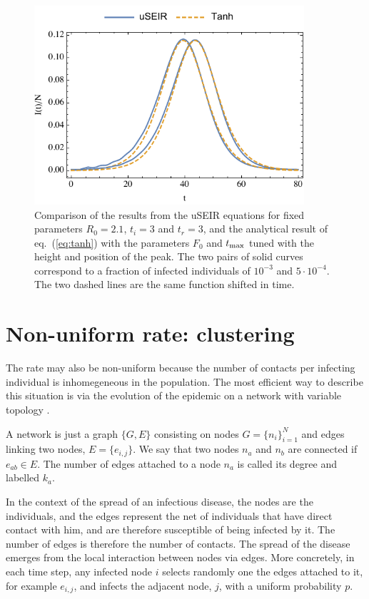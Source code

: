 \documentclass[a4paper,oneside,11pt]{article}
\begin{document}
\begin{figure}[h!]
  \centering
  \includegraphics[width=10cm]{logistica.pdf}
  \caption{Comparison of the results from the uSEIR equations for fixed parameters $R_0=2.1$, $t_i=3$ and $t_r=3$, and the analytical result of  eq.~(\ref{eq:tanh}) with the parameters $F_0$ and $t_{\rm max}$ tuned with the height and position of the peak. The two pairs of solid curves correspond to a fraction of infected individuals of $10^{-3}$ and $5\cdot 10^{-4}$. The two dashed lines are the same function shifted in time.}
  \label{fig:dispersion}
   \end{figure}

   \section{Non-uniform rate: clustering  }
\label{sec:r}

The rate may also be non-uniform because the number of contacts per infecting individual is inhomegeneous in the population. The most efficient way to describe this situation is via the evolution of the epidemic on a network with variable topology \cite{}.

A network is just a graph \(\{G,E\}\)
consisting on
nodes \(G=\{n_i\}_{i=1}^N\) and edges linking two nodes, \(E=\{e_{i,j}\}\). We say that
two nodes \(n_a\) and \(n_b\) are connected if \(e_{ab}\in E\). The number
of edges attached to a node \(n_a\) is called its degree and labelled
\(k_a\).

In the context of the spread of an infectious disease, the nodes are
the individuals, and the edges represent the net of individuals
that have direct contact with him, and are therefore susceptible of being infected by it. The number of edges is therefore the number of contacts. The spread of the disease emerges from the local interaction between nodes via edges. More concretely, in each time step, any infected node $i$ selects randomly one the edges attached to it, for example $e_{i,j}$, and infects the adjacent node, $j$, with a uniform probability $p$.
\end{document}
